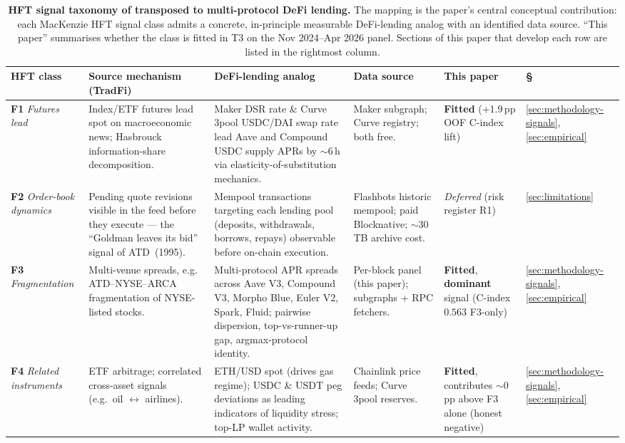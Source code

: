 \begin{table}[t]
  \centering
  \caption{\textbf{HFT signal taxonomy of \cite[Table 3.2]{mackenzie2021}
    transposed to multi-protocol DeFi lending.}  The mapping is
    the paper's central conceptual contribution: each MacKenzie HFT
    signal class admits a concrete, in-principle measurable
    DeFi-lending analog with an identified data source.  ``This
    paper'' summarises whether the class is fitted in T3 on the
    Nov 2024--Apr 2026 panel.  Sections of this paper that develop
    each row are listed in the rightmost column.}
  \label{tab:hft-defi-mapping}
  \footnotesize
  \setlength{\tabcolsep}{4pt}
  \begin{tabular}{p{} p{} p{} p{} p{} p{}}
    \toprule
    HFT class \cite{mackenzie2021} & Source mechanism (TradFi) & DeFi-lending analog
        & Data source & This paper & §\\
    \midrule
    \textbf{F1} \emph{Futures lead}
      & Index/ETF futures lead spot on macroeconomic news; Hasbrouck
        information-share decomposition.
      & Maker DSR rate \& Curve 3pool USDC/DAI swap rate lead Aave
        and Compound USDC supply APRs by $\sim 6$\,h via
        elasticity-of-substitution mechanics.
      & Maker subgraph; Curve registry; both free.
      & \textbf{Fitted} (+1.9\,pp OOF C-index lift)
      & \ref{sec:methodology-signals}, \ref{sec:empirical}\\
    \midrule
    \textbf{F2} \emph{Order-book dynamics}
      & Pending quote revisions visible in the feed before they
        execute --- the ``Goldman leaves its bid'' signal of
        ATD~(1995).
      & Mempool transactions targeting each lending pool
        (deposits, withdrawals, borrows, repays) observable before
        on-chain execution.
      & Flashbots historic mempool; paid Blocknative; $\sim 30$\,TB
        archive cost.
      & \emph{Deferred} (risk register R1)
      & \ref{sec:limitations}\\
    \midrule
    \textbf{F3} \emph{Fragmentation}
      & Multi-venue spreads, e.g. ATD--NYSE--ARCA fragmentation
        of NYSE-listed stocks.
      & Multi-protocol APR spreads across Aave V3, Compound V3,
        Morpho Blue, Euler V2, Spark, Fluid; pairwise dispersion,
        top-vs-runner-up gap, argmax-protocol identity.
      & Per-block panel (this paper); subgraphs + RPC fetchers.
      & \textbf{Fitted}, \textbf{dominant} signal (C-index $0.563$
        F3-only)
      & \ref{sec:methodology-signals}, \ref{sec:empirical}\\
    \midrule
    \textbf{F4} \emph{Related instruments}
      & ETF arbitrage; correlated cross-asset signals
        (e.g.\ oil $\leftrightarrow$ airlines).
      & ETH/USD spot (drives gas regime); USDC \& USDT peg
        deviations as leading indicators of liquidity stress;
        top-LP wallet activity.
      & Chainlink price feeds; Curve 3pool reserves.
      & \textbf{Fitted}, contributes $\sim 0$\,pp above F3 alone
        (honest negative)
      & \ref{sec:methodology-signals}, \ref{sec:empirical}\\
    \bottomrule
  \end{tabular}
\end{table}

